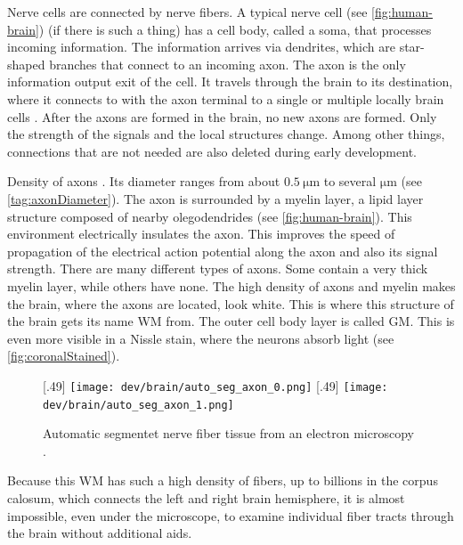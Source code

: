 %
Nerve cells are connected by nerve fibers.
A typical nerve cell (see \cref{fig:human-brain}) (if there is such a thing) has a cell body, called a soma, that processes incoming information.
The information arrives via dendrites, which are star-shaped branches that connect to an incoming axon.
The axon is the only information output exit of the cell.
It travels through the brain to its destination, where it connects to with the axon terminal to a single or multiple locally brain cells .
After the axons are formed in the brain, no new axons are formed.
Only the strength of the signals and the local structures change.
Among other things, connections that are not needed are also deleted during early development.
\par
%
Density of axons \dummy{}.
Its diameter ranges from about $\SI{0.5}{\micro\meter}$ to several $\si{\micro\meter}$ (see \cref{tag:axonDiameter}).
The axon is surrounded by a myelin layer, a lipid layer structure composed of nearby olegodendrides (see \cref{fig:human-brain}).
This environment electrically insulates the axon.
This improves the speed of propagation of the electrical action potential along the axon and also its signal strength.
There are many different types of axons.
Some contain a very thick myelin layer, while others have none.
The high density of axons and myelin makes the brain, where the axons are located, look white.
This is where this structure of the brain gets its name \ac{WM} from.
The outer cell body layer is called \ac{GM}.
This is even more visible in a Nissle stain, where the neurons absorb light (see \cref{fig:coronalStained}).
\par
%
%
%
\begin{figure}[!t]
	\centering
	\subcaptionbox{}[.49\textwidth]{
	    \texttt{[image: dev/brain/auto\_seg\_axon\_0.png]}}\hfill
    \subcaptionbox{}[.49\textwidth]{
        \texttt{[image: dev/brain/auto\_seg\_axon\_1.png]}}
	\caption{Automatic segmentet nerve fiber tissue from an electron microscopy \cite{Abdollahzadeh2019}. }
	\label{fig:elecMic}
\end{figure}
%
Because this \ac{WM} has such a high density of fibers, up to billions in the corpus calosum, which connects the left and right brain hemisphere, it is almost impossible, even under the microscope, to examine individual fiber tracts through the brain without additional aids.
